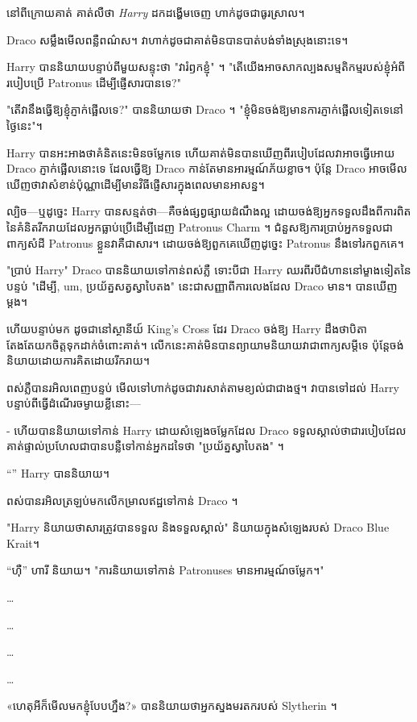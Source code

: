 {{{{{{{{នៅពីក្រោយគាត់ គាត់លឺថា \emph{Harry} ដកដង្ហើមចេញ ហាក់ដូចជាធូរស្រាល។

Draco សម្លឹងមើលពន្លឺពណ៌ស។ វាហាក់ដូចជាគាត់មិនបានបាត់បង់ទាំងស្រុងនោះទេ។

Harry បាននិយាយបន្ទាប់ពីមួយសន្ទុះថា "វារំឭកខ្ញុំ" ។ "តើយើងអាចសាកល្បងសម្មតិកម្មរបស់ខ្ញុំអំពីរបៀបប្រើ Patronus ដើម្បីផ្ញើសារបានទេ?"

"តើវានឹងធ្វើឱ្យខ្ញុំភ្ញាក់ផ្អើលទេ?" បាននិយាយថា Draco ។ "ខ្ញុំ​មិន​ចង់​ឱ្យ​មាន​ការ​ភ្ញាក់​ផ្អើល​ទៀត​ទេ​នៅ​ថ្ងៃ​នេះ"។

\later

Harry បានអះអាងថាគំនិតនេះមិនចម្លែកទេ ហើយគាត់មិនបានឃើញពីរបៀបដែលវាអាចធ្វើអោយ Draco ភ្ញាក់ផ្អើលនោះទេ ដែលធ្វើឱ្យ Draco កាន់តែមានអារម្មណ៍ភ័យខ្លាច។ ប៉ុន្តែ Draco អាច​មើល​ឃើញ​ថា​វា​សំខាន់​ប៉ុណ្ណា​ដើម្បី​មាន​វិធី​ផ្ញើ​សារ​ក្នុង​ពេល​មាន​អាសន្ន។

ល្បិច—ឬដូច្នេះ Harry បានសន្មត់ថា—គឺចង់ផ្សព្វផ្សាយដំណឹងល្អ ដោយចង់ឱ្យអ្នកទទួលដឹងពីការពិតនៃគំនិតរីករាយដែលអ្នកធ្លាប់ប្រើដើម្បីដេញ Patronus Charm ។ ជំនួសឱ្យការប្រាប់អ្នកទទួលជាពាក្យសំដី Patronus ខ្លួនវាគឺជាសារ។ ដោយ​ចង់​ឱ្យ​ពួក​គេ​ឃើញ​ដូច្នេះ Patronus នឹង​ទៅ​រក​ពួក​គេ​។

"ប្រាប់ Harry" Draco បាននិយាយទៅកាន់ពស់ភ្លឺ ទោះបីជា Harry ឈរពីរបីជំហាននៅម្ខាងទៀតនៃបន្ទប់ "ដើម្បី, um, ប្រយ័ត្នសត្វស្វាបៃតង" នេះជាសញ្ញាពីការលេងដែល Draco មាន។ បានឃើញម្តង។

ហើយបន្ទាប់មក ដូចជានៅស្ថានីយ៍ King's Cross ដែរ Draco ចង់ឱ្យ Harry ដឹងថាបិតាតែងតែយកចិត្តទុកដាក់ចំពោះគាត់។ លើក​នេះ​គាត់​មិន​បាន​ព្យាយាម​និយាយ​វា​ជា​ពាក្យ​សម្ដី​ទេ ប៉ុន្តែ​ចង់​និយាយ​ដោយ​ការ​គិត​ដោយ​រីករាយ។

ពស់ភ្លឺបានរអិលពេញបន្ទប់ មើលទៅហាក់ដូចជាវារសាត់តាមខ្យល់ជាជាងថ្ម។ វាបានទៅដល់ Harry បន្ទាប់ពីធ្វើដំណើរចម្ងាយខ្លីនោះ—

- ហើយបាននិយាយទៅកាន់ Harry ដោយសំឡេងចម្លែកដែល Draco ទទួលស្គាល់ថាជារបៀបដែលគាត់ផ្ទាល់ប្រហែលជាបានបន្លឺទៅកាន់អ្នកដទៃថា "ប្រយ័ត្នស្វាបៃតង" ។

“” Harry បាននិយាយ។

ពស់​បាន​រអិល​ត្រឡប់​មក​លើ​កម្រាល​ឥដ្ឋ​ទៅ​កាន់ Draco ។

"Harry និយាយ​ថា​សារ​ត្រូវ​បាន​ទទួល និង​ទទួល​ស្គាល់" និយាយ​ក្នុង​សំឡេង​របស់ Draco Blue Krait។

“ហ៊ឺ” ហារី និយាយ។ "ការនិយាយទៅកាន់ Patronuses មានអារម្មណ៍ចម្លែក។"

…

…

…

…

«ហេតុអីក៏មើលមកខ្ញុំបែបហ្នឹង?» បាននិយាយថាអ្នកស្នងមរតករបស់ Slytherin ។

}}}}}}}}
